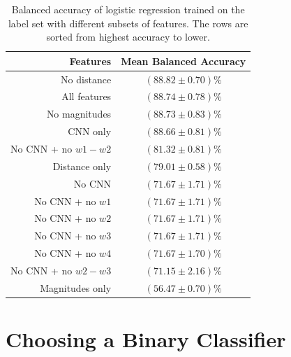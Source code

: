     \begin{table}[!ht]
      \centering
      \begin{tabular}{r|c}
        \textbf{Features} & \textbf{Mean Balanced Accuracy}\\\hline
        No distance & $(88.82 \pm 0.70)\%$\\
        All features & $(88.74 \pm 0.78)\%$\\
        No magnitudes & $(88.73 \pm 0.83)\%$\\
        CNN only & $(88.66 \pm 0.81)\%$\\
        No CNN + no $w1 - w2$ & $(81.32 \pm 0.81)\%$\\
        Distance only & $(79.01 \pm 0.58)\%$\\
        No CNN & $(71.67 \pm 1.71)\%$\\
        No CNN + no $w1$ & $(71.67 \pm 1.71)\%$\\
        No CNN + no $w2$ & $(71.67 \pm 1.71)\%$\\
        No CNN + no $w3$ & $(71.67 \pm 1.71)\%$\\
        No CNN + no $w4$ & $(71.67 \pm 1.70)\%$\\
        No CNN + no $w2 - w3$ & $(71.15 \pm 2.16)\%$\\
        Magnitudes only & $(56.47 \pm 0.70)\%$\\
      \end{tabular}
      \caption{Balanced accuracy of logistic regression trained on the
        \citeauthor{norris06} label set with different subsets of features. The
        rows are sorted from highest accuracy to lower.}
      \label{tab:feature-ablation}
    \end{table}

\section{Choosing a Binary Classifier}
\label{sec:binary-classifiers}
  
